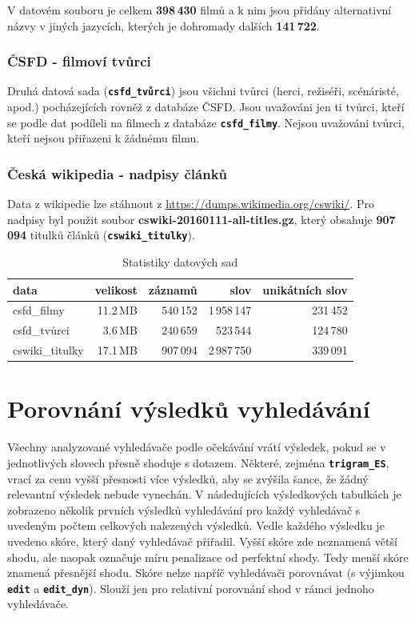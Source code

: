 \documentclass[11pt,letterpaper,oneside,openright]{book}
\newcommand{\bftt}[1]{\texttt{\textbf{#1}}}
\begin{document}
V datovém souboru je celkem \textbf{398\,430} filmů a k nim jsou přidány
alternativní názvy v jiných jazycích, kterých je dohromady dalších
\textbf{141\,722}.

\subsubsection{ČSFD - filmoví tvůrci}
Druhá datová sada (\bftt{csfd\_tvůrci}) jsou všichni tvůrci (herci, režiséři,
scénáristé, apod.) pocházejících rovněž z databáze ČSFD. Jsou uvažováni jen ti
tvůrci, kteří se podle dat podíleli na filmech z databáze \bftt{csfd\_filmy}.
Nejsou uvažováni tvůrci, kteří nejsou přiřazeni k žádnému filmu.

\subsubsection{Česká wikipedia - nadpisy článků}
Data z wikipedie lze stáhnout z \url{https://dumps.wikimedia.org/cswiki/}. Pro
nadpisy byl použit soubor \textbf{cswiki-20160111-all-titles.gz}, který
obsahuje \textbf{907\,094} titulků článků (\bftt{cswiki\_titulky}).


\mbox{}
\begin{tt}
\begin{table}[H]
\centering
\begin{tabulary}{\textwidth}{LRRRR}
\textbf{data} & \textbf{velikost} & \textbf{záznamů} & \textbf{slov} & \textbf{unikátních slov} \\
\hline
csfd\_filmy     & 11.2\,MB & 540\,152 & 1\,958\,147 & 231\,452 \\
csfd\_tvůrci    & 3.6\,MB  & 240\,659 & 523\,544    & 124\,780 \\
cswiki\_titulky & 17.1\,MB & 907\,094 & 2\,987\,750 & 339\,091 \\
\hline
\end{tabulary}
\caption{Statistiky datových sad}
\label{tab:data_stats}
\end{table}
\end{tt}

\section{Porovnání výsledků vyhledávání}
Všechny analyzované vyhledávače podle očekávání vrátí výsledek, pokud se v
jednotlivých slovech přesně shoduje s dotazem. Některé, zejména
\bftt{trigram\_ES}, vrací za cenu vyšší přesnosti více výsledků, aby se zvýšila
šance, že žádný relevantní výsledek nebude vynechán.  V následujících
výsledkových tabulkách je zobrazeno několik prvních výsledků vyhledávání pro
každý vyhledávač s uvedeným počtem celkových nalezených výsledků. Vedle každého
výsledku je uvedeno skóre, který daný vyhledávač přiřadil. Vyšší skóre zde
neznamená větší shodu, ale naopak označuje míru penalizace od perfektní shody.
Tedy menší skóre znamená přesnější shodu. Skóre nelze napříč vyhledávači
porovnávat (s výjimkou \bftt{edit} a \bftt{edit\_dyn}). Slouží jen pro
relativní porovnání shod v rámci jednoho vyhledávače.
\end{document}
